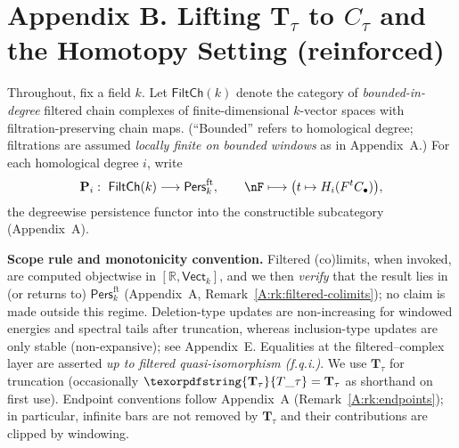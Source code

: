 \documentclass[11pt]{article}
\newcommand{\Pers}{\mathsf{Pers}}
\numberwithin{equation}{section}
\theoremstyle{definition}
\DeclareRobustCommand{\Ttau}{\texorpdfstring{\ensuremath{\mathbf{T}_{\tau}}}{T\_\tau}}
\begin{document}
\appendix
\section*{Appendix B. Lifting \texorpdfstring{$\mathbf{T}_\tau$}{T\_\tau} to \texorpdfstring{$C_\tau$}{C\_\tau} and the Homotopy Setting (reinforced)}


Throughout, fix a field \(k\).
Let \(\mathsf{FiltCh}(k)\) denote the category of \emph{bounded-in-degree} filtered chain complexes of finite-dimensional \(k\)-vector spaces with filtration-preserving chain maps.
(“Bounded” refers to homological degree; filtrations are assumed \emph{locally finite on bounded windows} as in Appendix~A.)
For each homological degree \(i\), write
\[
\mathbf{P}_i:\ \mathsf{FiltCh}(k)\longrightarrow \Pers^{\mathrm{ft}}_k,\qquad\nF\longmapsto \big(t\mapsto H_i(F^{t}C_\bullet)\big),
\]
the degreewise persistence functor into the constructible subcategory (Appendix~A).

\medskip
\noindent\textbf{Scope rule and monotonicity convention.}
Filtered (co)limits, when invoked, are computed objectwise in \([\mathbb{R},\mathsf{Vect}_k]\), and we then \emph{verify} that the result lies in (or returns to) \(\Pers^{\mathrm{ft}}_k\) (Appendix~A, Remark~\ref{A:rk:filtered-colimits}); no claim is made outside this regime.
Deletion-type updates are non-increasing for windowed energies and spectral tails after truncation, whereas inclusion-type updates are only stable (non-expansive); see Appendix~E.
Equalities at the filtered–complex layer are asserted \emph{up to filtered quasi-isomorphism (f.q.i.)}.
We use \(\mathbf{T}_\tau\) for truncation (occasionally \(\Ttau=\mathbf{T}_\tau\) as shorthand on first use).
Endpoint conventions follow Appendix~A (Remark~\ref{A:rk:endpoints}); in particular, infinite bars are not removed by \(\mathbf{T}_\tau\) and their contributions are clipped by windowing.

\end{document}
